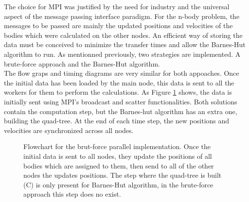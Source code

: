 The choice for MPI was justified by the need for industry and the universal aspect of the message passing interface paradigm. For the n-body problem, the messages to be passed are mainly the updated positions and velocities of the bodies which were calculated on the other nodes. An efficient way of storing the data must be conceived to minimize the transfer times and allow the Barnes-Hut algorithm to run. As mentionned previously, two strategies are implemented. A brute-force approach and the Barnes-Hut algorithm.\\
The flow graps and timing diagrams are very similar for both appoaches. Once the initial data has been loaded by the main node, this data is sent to all the workers for them to perform the calculations. As Figure \ref{fig:flow_chart} shows, the data is initially sent using MPI's broadcast and scatter functionalities. Both solutions contain the computation step, but the Barnes-hut algorithm has an extra one, building the quad-tree. At the end of each time step, the new positions and velocities are synchronized across all nodes.\\
\begin{figure}[H]
\centering
{}
\caption{Flowchart for the brut-force parallel implementation. Once the initial data is sent to all nodes, they update the positions of all bodies which are assigned to them, then send to all of the other nodes the updates positions. The step where the quad-tree is built (C) is only present for Barnes-Hut algorithm, in the brute-force approach this step does no exist.}
\label{fig:flow_chart}
\end{figure}

